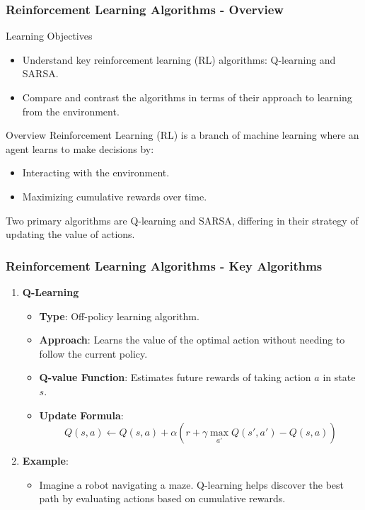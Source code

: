 \documentclass[aspectratio=169]{beamer}
\begin{document}
\begin{frame}[fragile]
    \frametitle{Reinforcement Learning Algorithms - Overview}
    \begin{block}{Learning Objectives}
        \begin{itemize}
            \item Understand key reinforcement learning (RL) algorithms: Q-learning and SARSA.
            \item Compare and contrast the algorithms in terms of their approach to learning from the environment.
        \end{itemize}
    \end{block}

    \begin{block}{Overview}
        Reinforcement Learning (RL) is a branch of machine learning where an agent learns to make decisions by:
        \begin{itemize}
            \item Interacting with the environment.
            \item Maximizing cumulative rewards over time.
        \end{itemize}
        Two primary algorithms are Q-learning and SARSA, differing in their strategy of updating the value of actions.
    \end{block}
\end{frame}

\begin{frame}[fragile]
    \frametitle{Reinforcement Learning Algorithms - Key Algorithms}
    \begin{enumerate}
        \item \textbf{Q-Learning}
        \begin{itemize}
            \item \textbf{Type}: Off-policy learning algorithm.
            \item \textbf{Approach}: Learns the value of the optimal action without needing to follow the current policy.
            \item \textbf{Q-value Function}: Estimates future rewards of taking action \( a \) in state \( s \).

            \item \textbf{Update Formula}:
            \begin{equation}
                Q(s, a) \leftarrow Q(s, a) + \alpha \left( r + \gamma \max_{a'} Q(s', a') - Q(s, a) \right)
            \end{equation}
        \end{itemize}

        \item \textbf{Example}:
        \begin{itemize}
            \item Imagine a robot navigating a maze. Q-learning helps discover the best path by evaluating actions based on cumulative rewards.
        \end{itemize}
    \end{enumerate}
\end{frame}
\end{document}

